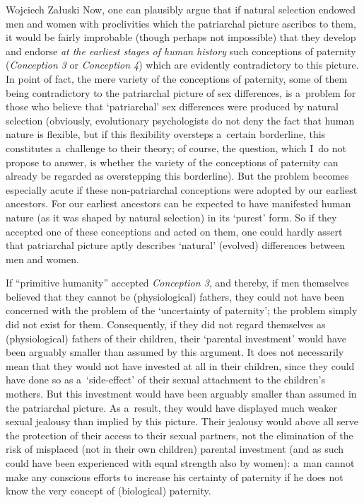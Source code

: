 \begin{artengenv}{Wojciech Załuski}
Now, one can plausibly argue that if natural selection endowed men and women with proclivities which the patriarchal picture ascribes to them, it would be fairly improbable (though perhaps not impossible) that they develop and endorse \textit{at the earliest stages of human history} such conceptions of paternity (\textit{Conception 3} or \textit{Conception 4}) which are evidently contradictory to this picture. In point of fact, the mere variety of the conceptions of paternity, some of them being contradictory to the patriarchal picture of sex differences, is a~problem for those who believe that ‘patriarchal' sex differences were produced by natural selection (obviously, evolutionary psychologists do not deny the fact that human nature is flexible, but if this flexibility oversteps a~certain borderline, this constitutes a~challenge to their theory; of course, the question, which I~do not propose to answer, is whether the variety of the conceptions of paternity can already be regarded as overstepping this borderline). But the problem becomes especially acute if these non-patriarchal conceptions were adopted by our earliest ancestors. For our earliest ancestors can be expected to have manifested human nature (as it was shaped by natural selection) in its ‘purest' form. So if they accepted one of these conceptions and acted on them, one could hardly assert that patriarchal picture aptly describes ‘natural' (evolved) differences between men and women.

If ``primitive humanity'' accepted \textit{Conception 3}, and thereby, if men themselves believed that they cannot be (physiological) fathers, they could not have been concerned with the problem of the ‘uncertainty of paternity'; the problem simply did not exist for them. Consequently, if they did not regard themselves as (physiological) fathers of their children, their ‘parental investment' would have been arguably smaller than assumed by this argument. It does not necessarily mean that they would not have invested at all in their children, since they could have done so as a~‘side-effect' of their sexual attachment to the children's mothers. But this investment would have been arguably smaller than assumed in the patriarchal picture. As a~result, they would have displayed much weaker sexual jealousy than implied by this picture. Their jealousy would above all serve the protection of their access to their sexual partners, not the elimination of the risk of misplaced (not in their own children) parental investment (and as such could have been experienced with equal strength also by women): a~man cannot make any conscious efforts to increase his certainty of paternity if he does not know the very concept of (biological) paternity.


\end{artengenv}
